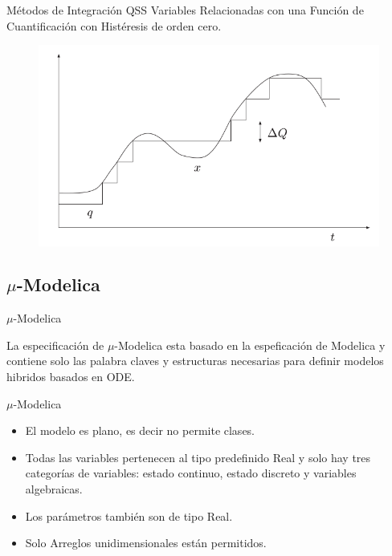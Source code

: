 \documentclass[10pt,presentation]{beamer}
\begin{document}
\begin{frame}{Métodos de Integración QSS}
	  Variables Relacionadas con una Función de Cuantificación con Histéresis de orden cero.
	\begin{figure}[H]
	  \includegraphics[scale=0.35]{histeresis1}
	\end{figure}
\end{frame}

	\subsection{$\mu$-Modelica}

\begin{frame}{$\mu$-Modelica}

\begin{block}{La especificación de }
$\mu$-Modelica esta basado en la espeficación de Modelica y contiene solo las palabra claves y estructuras necesarias para definir modelos hibridos basados en ODE.
\end{block}
\end{frame}

\begin{frame}{$\mu$-Modelica}
	\begin{itemize}
	 \item<1-> El modelo es plano, es decir no permite clases.
	 \item<2-> Todas las variables pertenecen al tipo predefinido Real y solo hay tres categorías de variables: estado continuo, estado discreto y variables 
	algebraicas.
	 \item<3-> Los parámetros también son de tipo Real. 
	 \item<4-> Solo Arreglos unidimensionales están permitidos. 
	 \end{itemize}
\end{frame}
\end{document}
